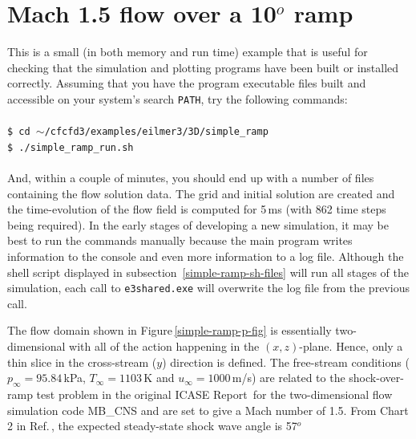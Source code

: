 
\section{Mach 1.5 flow over a 10$^o$ ramp}
\label{simple-ramp-sec}
%
This is a small (in both memory and run time) example 
that is useful for checking that the simulation and
plotting programs have been built or installed correctly.
Assuming that you have the program executable files built and
accessible on your system's search \texttt{PATH}, 
try the following commands:\\
%
\topbar\\
\texttt{\$ cd $\sim$/cfcfd3/examples/eilmer3/3D/simple\_ramp}\\
\texttt{\$ ./simple\_ramp\_run.sh}\\
\bottombar\\
%
And, within a couple of minutes, you should end up with a number of files
containing the flow solution data.
The grid and initial solution are created and the time-evolution of the
flow field is computed for 5\,ms (with 862 time steps being required).
In the early stages of developing a new simulation, it may be best to run the
commands manually because the main program writes information to the console
and even more information to a log file.
Although the shell script displayed in subsection~\ref{simple-ramp-sh-files}
will run all stages of the simulation, each call to \texttt{e3shared.exe}
will overwrite the log file from the previous call.

\medskip
The flow domain shown in Figure\,\ref{simple-ramp-p-fig} is essentially
two-dimensional with all of the action happening in the $(x,z)$-plane.
Hence, only a thin slice in the cross-stream ($y$) direction is defined.
The free-stream conditions ($p_{\infty} = 95.84$\,kPa, $T_{\infty} = 1103$\,K
and $u_{\infty} = 1000$\,m/s) are related to the shock-over-ramp test problem
in the original ICASE Report\,\cite{jacobs_91d} for the two-dimensional flow
simulation code MB\_CNS and are set to give a Mach number of 1.5.
From Chart 2 in Ref.\,\cite{ames_53}, the expected steady-state shock wave
angle is 57$^o$


